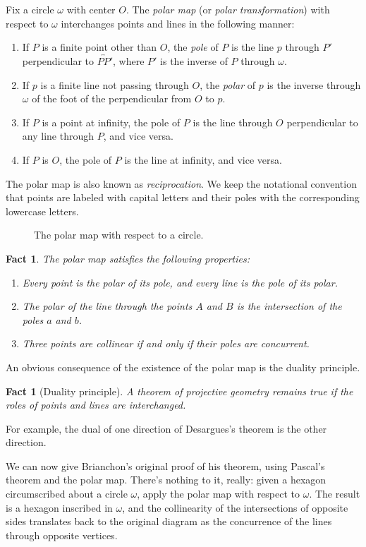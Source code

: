 \documentclass[12pt]{book}
\numberwithin{exc}{section}
\numberwithin{figure}{section}
\newtheorem{fact}[theorem]{Fact}
\numberwithin{equation}{theorem}
\def\ii{\item}
\def\line#1{\overleftrightarrow{#1}}
\begin{document}
Fix a circle $\omega$ with center $O$.
The \emph{polar map}  (or \emph{polar
transformation}) 
with respect to $\omega$ 
interchanges points and lines in the following manner:
\begin{enumerate}
\ii
If $P$ is a 
finite point other than $O$, the \emph{pole} of $P$ 
is the line $p$ through $P'$ perpendicular to $\line{PP'}$, where $P'$ is the
inverse of $P$ through $\omega$.
\ii
If $p$ is a finite line not passing through $O$, 
the \emph{polar} 
of $p$ is the inverse through $\omega$ of the foot 
of the perpendicular from $O$ to $p$.
\ii
If $P$ is a point at infinity, the pole of $P$ is the line through $O$ 
perpendicular to any line through $P$, and vice versa.
\ii
If $P$ is $O$, the pole of $P$ is the line at infinity, and vice versa.
\end{enumerate}
The polar map is also known as \emph{reciprocation}. 
 We keep the 
notational convention that points are labeled with capital letters and 
their poles with the corresponding lowercase letters. 
\begin{figure}
\caption{The polar map with respect to a circle.}
\end{figure}

\begin{fact} \label{thm:poleprop}
The polar map satisfies the following properties:
\begin{enumerate}
\ii
Every point is the polar of its pole, and every line is the pole of 
its polar.
\ii
The polar of the line through the points $A$ and $B$ is the 
intersection of the poles $a$ and $b$.
\ii
Three points are collinear if and only if their poles are concurrent.
\end{enumerate}
\end{fact}

An obvious consequence of the existence of the polar map is the 
duality principle. 
\begin{fact}[Duality principle]
A theorem of projective geometry remains true if the roles of points 
and lines are interchanged.
\end{fact}
For example, the dual of one direction of Desargues's theorem is the 
other direction.

We can now give Brianchon's original proof of his theorem, 
 using 
Pascal's theorem 
and the polar map. There's nothing to it, really: 
given a hexagon circumscribed about a circle $\omega$, apply the polar 
map with respect to $\omega$. The result is a hexagon inscribed in 
$\omega$, and the collinearity of the intersections of opposite sides 
translates back to the original diagram as the concurrence of the 
lines through opposite vertices.
\end{document}
